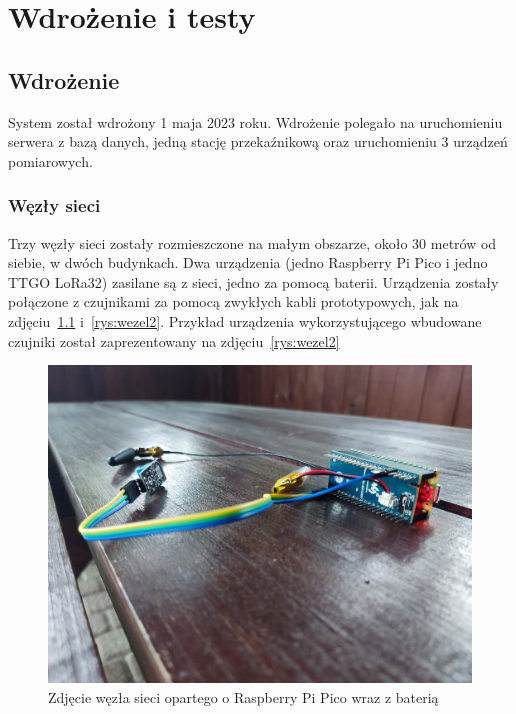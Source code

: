 \chapter{Wdrożenie i testy}

\section{Wdrożenie}
System został wdrożony 1 maja 2023 roku. Wdrożenie polegało na uruchomieniu serwera z bazą danych, jedną stację przekaźnikową oraz uruchomieniu 3 urządzeń pomiarowych.

\subsection{Węzły sieci}

Trzy węzły sieci zostały rozmieszczone na małym obszarze, około 30 metrów od siebie, w dwóch budynkach. Dwa urządzenia (jedno Raspberry Pi Pico i jedno TTGO LoRa32) zasilane są z sieci, jedno za pomocą baterii. Urządzenia zostały połączone z czujnikami za pomocą zwykłych kabli prototypowych, jak na zdjęciu~\ref{rys:wezel1} i~\ref{rys:wezel2}. Przykład urządzenia wykorzystującego wbudowane czujniki został zaprezentowany na zdjęciu~\ref{rys:wezel2}

\begin{figure}[b!]
    \begin{center}
        \includegraphics[width=13cm]{pic/wezel1.jpg}
    \end{center}
    \caption{Zdjęcie węzła sieci opartego o Raspberry Pi Pico wraz z baterią}\label{rys:wezel1}
\end{figure}

